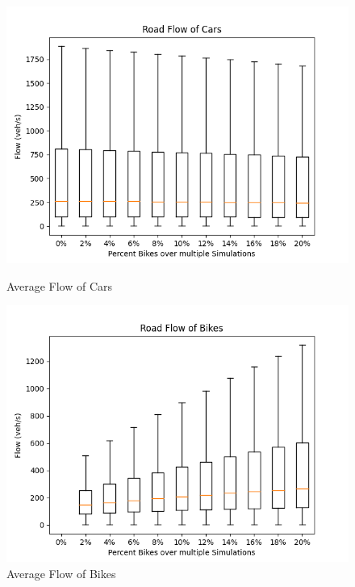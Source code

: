 \begin{figure}[H]
\vspace{-1.25cm}
    \centering
    \begin{minipage}{0.45\textwidth}
        \centering
        \includegraphics[width=\linewidth]{./figures/road_flow_car.png} 
         \caption{Average Flow of Cars}\label{avg-flow-cars}
    \end{minipage}
    \begin{minipage}{0.45\textwidth}
        \centering
        \includegraphics[width=\linewidth]{./figures/road_flow_bike.png} 
         \caption{Average Flow of Bikes}\label{avg-flow-bikes}
    \end{minipage}
\end{figure}
\vspace{-0.8cm}

